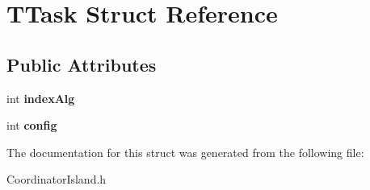 \hypertarget{structTTask}{}\section{T\+Task Struct Reference}
\label{structTTask}
\subsection*{Public Attributes}
\begin{DoxyCompactItemize}
\item 
\mbox{\label{structTTask_a4d9c547f8ad487e7388255e74a7225bf}} 
int {\bfseries index\+Alg}
\item 
\mbox{\label{structTTask_a4ae10ca6a5d4696cde4f31338651e9c9}} 
int {\bfseries config}
\end{DoxyCompactItemize}


The documentation for this struct was generated from the following file\+:\begin{DoxyCompactItemize}
\item 
Coordinator\+Island.\+h\end{DoxyCompactItemize}
